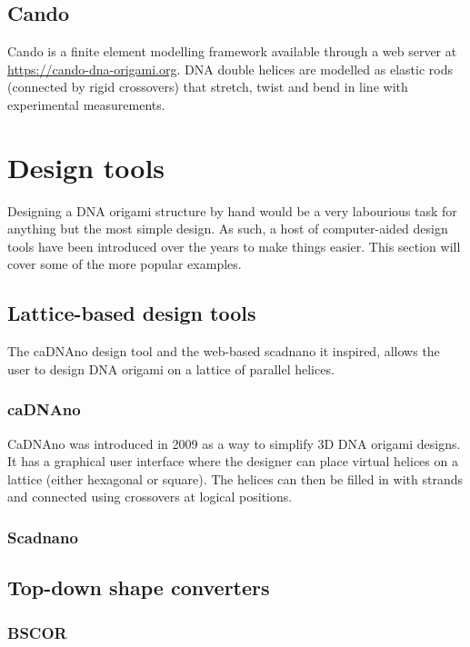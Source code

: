 \subsection{Cando}

Cando is a finite element modelling framework\cite{kim2012cando} available through a web server at \url{https://cando-dna-origami.org}. DNA double helices are modelled as elastic rods (connected by rigid crossovers) that stretch, twist and bend in line with experimental measurements.

\section{Design tools}\label{sec:design_tools}
Designing a DNA origami structure by hand would be a very labourious task for anything but the most simple design. As such, a host of computer-aided design tools have been introduced over the years to make things easier. This section will cover some of the more popular examples.

\subsection{Lattice-based design tools}
The caDNAno design tool \cite{cadnano} and the web-based scadnano\cite{scadnano} it inspired, allows the user to design DNA origami on a lattice of parallel helices.
\subsubsection{caDNAno}
CaDNAno \cite{cadnano} was introduced in 2009 as a way to simplify 3D DNA origami designs. It has a graphical user interface where the designer can place virtual helices on a lattice (either hexagonal or square). The helices can then be filled in with strands and connected using crossovers at logical positions.
\subsubsection{Scadnano}

\subsection{Top-down shape converters}

\subsubsection{BSCOR}\label{sec:bscor}
